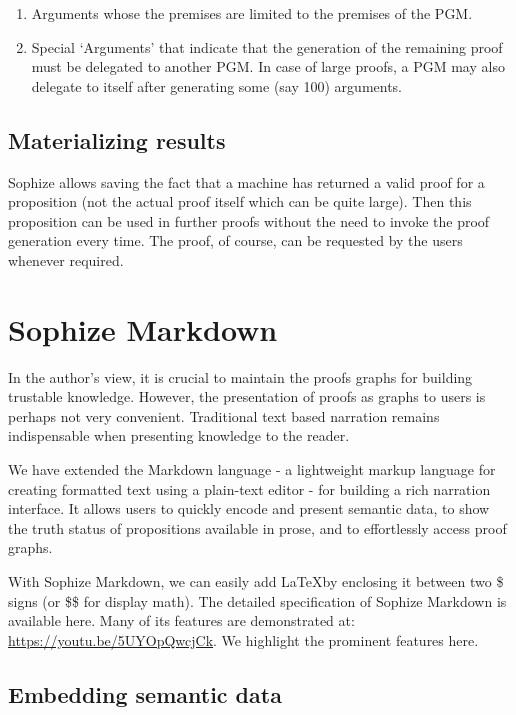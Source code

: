 \documentclass[a4paper]{article}
\begin{document}
\begin{enumerate}
\item Arguments whose the premises are limited to the premises of the PGM.
\item Special `Arguments' that indicate that the generation of the remaining proof must be delegated to another PGM. In case of large proofs, a PGM may also delegate to itself after generating some (say 100) arguments.
\end{enumerate}
\subsection{Materializing results}

Sophize allows saving the fact that a machine has returned a valid proof for a proposition (not the actual proof itself which can be quite large). Then this proposition can be used in further proofs without the need to invoke the proof generation every time. The proof, of course, can be requested by the users whenever required.


\section{Sophize Markdown}

In the author's view, it is crucial to maintain the proofs graphs for building trustable knowledge. However, the presentation of proofs as graphs to users is perhaps not very convenient. Traditional text based narration remains indispensable when presenting knowledge to the reader.

We have extended the Markdown language - a lightweight markup language for creating formatted text using a plain-text editor - for building a rich narration interface. It allows users to quickly encode and present semantic data, to show the truth status of propositions available in prose, and to effortlessly access proof graphs. 

With Sophize Markdown, we can easily add \LaTeX\space by enclosing it between two \$ signs (or \$\$ for display math). The detailed specification of Sophize Markdown is available here. Many of its features are demonstrated at: \url{https://youtu.be/5UYOpQwcjCk}. We highlight the prominent features here.

\subsection{Embedding semantic data}
\end{document}

